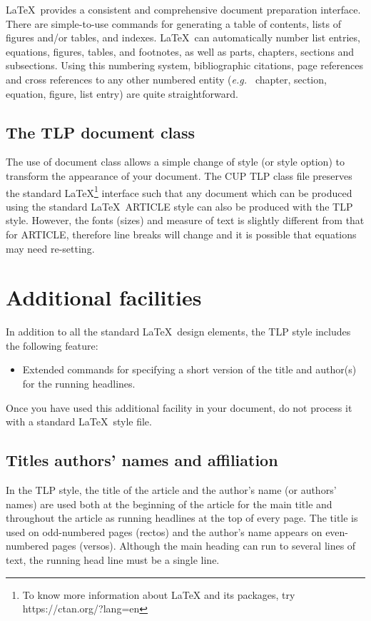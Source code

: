 \documentclass{tlp}
\begin{document}
\LaTeX\ provides a consistent and comprehensive document preparation
interface. There are simple-to-use commands for generating a table of
contents, lists of figures and/or tables, and indexes. \LaTeX\ can
automatically number list entries, equations, figures, tables, and
footnotes, as well as parts, chapters, sections and subsections.
Using this numbering system, bibliographic citations, page references
and cross references to any other numbered entity ({\it e.g.\ } chapter,
section, equation, figure, list entry) are quite straightforward.

\subsection{The TLP document class}

The use of document class allows a simple change of style (or style option)
to transform the appearance of your document. The CUP TLP class file preserves
the standard \LaTeX\footnote{To know more information about LaTeX and its packages, try https://ctan.org/?lang=en} interface such that any document which can be produced
using the standard \LaTeX\ ARTICLE style can also be produced with the
TLP style. However, the fonts (sizes) and measure of text is slightly different
from that for ARTICLE, therefore line breaks will change and it is possible
that equations may need re-setting.

\section{Additional facilities}

In addition to all the standard \LaTeX\ design elements, the TLP style
includes the following feature:
\begin{itemize}
  \item Extended commands for specifying a short version
        of the title and author(s) for the running
        headlines.
\end{itemize}
Once you have used this additional facility in your document,
do not process it with a standard \LaTeX\ style file.

\subsection{Titles authors' names and affiliation}

In the TLP style, the title of the article and the author's name (or authors'
names) are used both at the beginning of the article for the main title and
throughout the article as running headlines at the top of every page.
The title is used on odd-numbered pages (rectos) and the author's name appears
on even-numbered pages (versos).
Although the main heading can run to several lines of text, the running head
line must be a single line.
\end{document}
